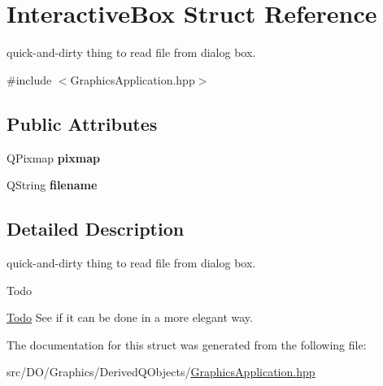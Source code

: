 \hypertarget{struct_d_o_1_1_interactive_box}{\section{Interactive\-Box Struct Reference}
\label{struct_d_o_1_1_interactive_box}
}


quick-\/and-\/dirty thing to read file from dialog box.  




{\ttfamily \#include $<$Graphics\-Application.\-hpp$>$}

\subsection*{Public Attributes}
\begin{DoxyCompactItemize}
\item 
\hypertarget{struct_d_o_1_1_interactive_box_a734934801a260897766516dac3a878bd}{Q\-Pixmap {\bfseries pixmap}}\label{struct_d_o_1_1_interactive_box_a734934801a260897766516dac3a878bd}

\item 
\hypertarget{struct_d_o_1_1_interactive_box_aac274af37f5fbaaa2c47d19145cfd856}{Q\-String {\bfseries filename}}\label{struct_d_o_1_1_interactive_box_aac274af37f5fbaaa2c47d19145cfd856}

\end{DoxyCompactItemize}


\subsection{Detailed Description}
quick-\/and-\/dirty thing to read file from dialog box. 

\begin{DoxyRefDesc}{Todo}
\item[\hyperlink{todo__todo000002}{Todo}]See if it can be done in a more elegant way. \end{DoxyRefDesc}


The documentation for this struct was generated from the following file\-:\begin{DoxyCompactItemize}
\item 
src/\-D\-O/\-Graphics/\-Derived\-Q\-Objects/\hyperlink{_graphics_application_8hpp}{Graphics\-Application.\-hpp}\end{DoxyCompactItemize}
